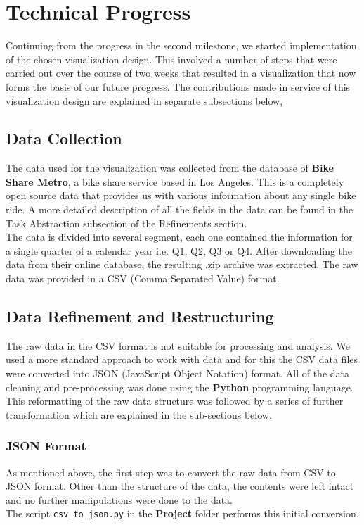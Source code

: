 \section{Technical Progress} 
\label{sec:technical_progress}

Continuing from the progress in the second milestone, we started implementation of the chosen visualization design. This involved a number of steps that were carried out over the course of two weeks that resulted in a visualization that now forms the basis of our future progress. The contributions made in service of this visualization design are explained in separate subsections below,

\subsection{Data Collection}
\label{sec:data collection}

The data used for the visualization was collected from the database of \textbf{Bike Share Metro}, a bike share service based in Los Angeles. This is a completely open source data that provides us with various information about any single bike ride. A more detailed description of all the fields in the data can be found in the Task Abstraction subsection of the Refinements section.\\
The data is divided into several segment, each one contained the information for a single quarter of a calendar year i.e. Q1, Q2, Q3 or Q4. After downloading the data from their online database, the resulting .zip archive was extracted. The raw data was provided in a CSV (Comma Separated Value) format.

\subsection{Data Refinement and Restructuring}
\label{sec:data refinement and restructuring}

The raw data in the CSV format is not suitable for processing and analysis. We used a more standard approach to work with data and for this the CSV data files were converted into JSON (JavaScript Object Notation) format. All of the data cleaning and pre-processing was done using the \textbf{Python} programming language. This reformatting of the raw data structure was followed by a series of further transformation which are explained in the sub-sections below.

\subsubsection{JSON Format}
As mentioned above, the first step was to convert the raw data from CSV to JSON format. Other than the structure of the data, the contents were left intact and no further manipulations were done to the data.\\
The script \texttt{csv\_to\_json.py} in the \textbf{Project} folder performs this initial conversion.

